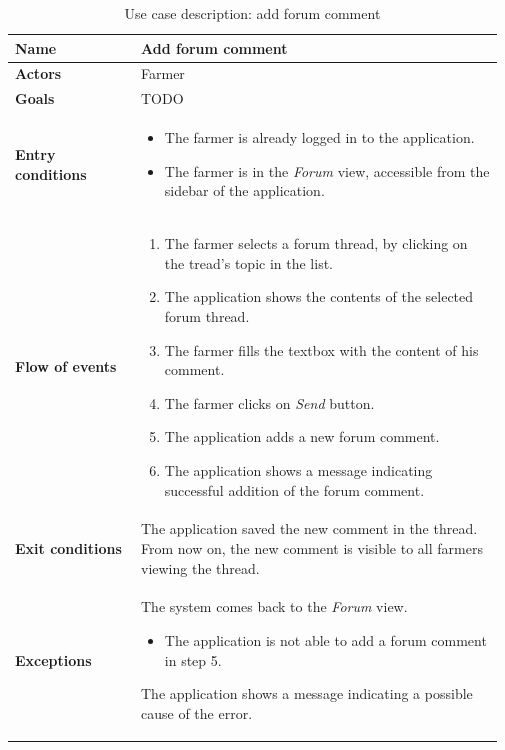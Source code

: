 \begin{table}[H]
    \centering
	\begin{tabular}{@{}p{0.25\linewidth} p{0.72\linewidth}@{}}
\toprule
		\textbf{Name}               & Add forum comment \\
		\midrule
		\textbf{Actors}             & Farmer\\
		\midrule
		\textbf{Goals}              & TODO \\
		\midrule
		
		\textbf{Entry conditions}   & \begin{itemize}[leftmargin=.4cm,noitemsep,topsep=0pt,before=\vspace{-3mm},after=\vspace{-4mm}]
		    \item The farmer is already logged in to the application.
		    \item The farmer is in the \textit{Forum} view, accessible from the sidebar of the application.
		\end{itemize}\\
		\midrule
		
		\textbf{Flow of events}     & \begin{enumerate}[leftmargin=.4cm,noitemsep,topsep=0pt,before=\vspace{-3mm},after=\vspace{-4mm}]
		    \item The farmer selects a forum thread, by clicking on the tread's topic in the list.
		    \item The application shows the contents of the selected forum thread.
		    \item The farmer fills the textbox with the content of his comment.
		    \item The farmer clicks on \textit{Send} button.
		    \item The application adds a new forum comment.
		    \item The application shows a message indicating successful addition of the forum comment.
		\end{enumerate}\\
		\midrule
		\textbf{Exit conditions} & The application saved the new comment in the thread. From now on, the new comment is visible to all farmers viewing the thread. \\
		\midrule
		
		\textbf{Exceptions}         &
	    The system comes back to the \textit{Forum} view.
	    \begin{itemize}[leftmargin=.4cm,noitemsep,topsep=0pt]
		   \item The application is not able to add a forum comment in step 5. 
		\end{itemize}
		The application shows a message indicating a possible cause of the error.
		\\\bottomrule
	\end{tabular}
	\caption{Use case description: add forum comment} 
\end{table}

